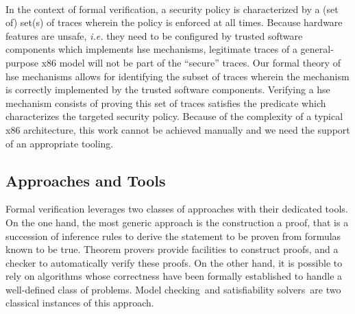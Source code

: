 
\paragraph*{}
%
In the context of formal verification, a security policy is characterized by a
(set of) set(s) of traces wherein the policy is enforced at all times.
%
Because hardware features are unsafe, \emph{i.e.} they need to be configured by
trusted software components which implements \ac{hse} mechanisms, legitimate
traces of a general-purpose x86 model will not be part of the ``secure'' traces.
%
Our formal theory of \ac{hse} mechanisms allows for identifying the subset of
traces wherein the mechanism is correctly implemented by the trusted software
components. Verifying a \ac{hse} mechanism consists of proving this set of
traces satisfies the predicate which characterizes the targeted security policy.
%
Because of the complexity of a typical x86 architecture, this work cannot be
achieved manually and we need the support of an appropriate tooling.

\subsection{Approaches and Tools}
\label{subsec:sota:tools}


Formal verification leverages two classes of approaches with their dedicated
tools.
%
On the one hand, the most generic approach is the construction a proof, that is
a succession of inference rules to derive the statement to be proven from
formulas known to be true.
%
Theorem provers provide facilities to construct proofs, and a checker to
automatically verify these proofs.
%
On the other hand, it is possible to rely on algorithms whose correctness have
been formally established to handle a well-defined class of problems.
%
Model checking\,\cite{clarke2018modelc} and satisfiability
solvers\,\cite{gomes2008satisfiability} are two classical instances of this
approach.

